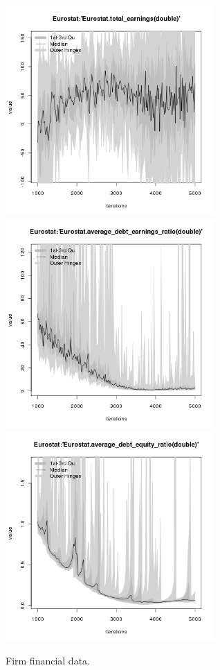 \begin{figure}[H!]
\begin{minipage}{17cm}
\includegraphics[width=8cm]{./png/tax_0.10/Eurostat-total_earnings.png}\\
\includegraphics[width=8cm]{./png/tax_0.10/Eurostat-average_debt_earnings_ratio.png}
\includegraphics[width=8cm]{./png/tax_0.10/Eurostat-average_debt_equity_ratio.png}
\end{minipage}
\caption{Firm financial data.}
\label{Figure: Firm Financial Data}
\end{figure}


